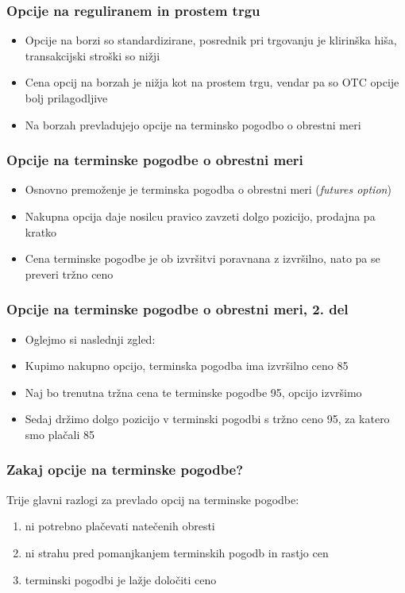 \documentclass[14pt]{beamer}
\begin{document}
\begin{frame}
    \frametitle{Opcije na reguliranem in prostem trgu}
    \begin{itemize}
        \item Opcije na borzi so standardizirane, posrednik pri trgovanju je klirinška hiša, transakcijski stroški so nižji
        \item Cena opcij na borzah je nižja kot na prostem trgu, vendar pa so OTC opcije bolj prilagodljive
        \item Na borzah prevladujejo opcije na terminsko pogodbo o obrestni meri
    \end{itemize}
\end{frame}

\begin{frame}
    \frametitle{Opcije na terminske pogodbe o obrestni meri}
    \begin{itemize}
        \item Osnovno premoženje je terminska pogodba o obrestni meri (\textit{futures option})
        \item Nakupna opcija daje nosilcu pravico zavzeti dolgo pozicijo, prodajna pa kratko
        \item Cena terminske pogodbe je ob izvršitvi poravnana z izvršilno, nato pa se preveri tržno ceno
    \end{itemize}
\end{frame}

\begin{frame}
    \frametitle{Opcije na terminske pogodbe o obrestni meri, 2. del}
        \begin{itemize}
            \item Oglejmo si naslednji zgled:
            \item Kupimo nakupno opcijo, terminska pogodba ima izvršilno ceno 85\textdollar
            \item Naj bo trenutna tržna cena te terminske pogodbe 95\textdollar, opcijo izvršimo
            \item Sedaj držimo dolgo pozicijo v terminski pogodbi s tržno ceno 95\textdollar, za katero smo plačali 85\textdollar
        \end{itemize}
\end{frame}

\begin{frame}
    \frametitle{Zakaj opcije na terminske pogodbe?}
    Trije glavni razlogi za prevlado opcij na terminske pogodbe:
    \begin{enumerate}
        \item ni potrebno plačevati natečenih obresti
        \item ni strahu pred pomanjkanjem terminskih pogodb in rastjo cen
        \item terminski pogodbi je lažje določiti ceno
    \end{enumerate}
\end{frame}
        
\end{document}
